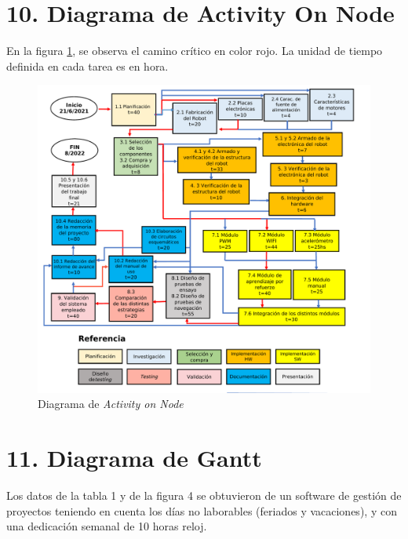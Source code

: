 \documentclass[
11pt, %
codirector, %
]{charter}
\begin{document}
\pagebreak

\section{10. Diagrama de Activity On Node}
\label{sec:AoN}

En la figura \ref{fig:AoN}, se observa el camino crítico en color rojo. La unidad de tiempo definida en cada tarea es en hora.
 
\begin{figure}[htpb]
\centering 
\includegraphics[width=\textwidth]{./Figuras/AoN.pdf}
\caption{Diagrama de \textit{Activity on Node}}
\label{fig:AoN}
\end{figure}


\section{11. Diagrama de Gantt}
\label{sec:gantt}

Los datos de la tabla 1 y de la figura 4 se obtuvieron de un software de gestión de proyectos teniendo en cuenta los días no laborables (feriados y vacaciones), y con una dedicación semanal de 10 horas reloj.
\end{document}
